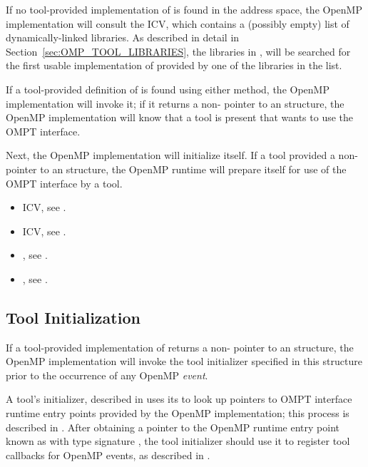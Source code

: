 If no tool-provided implementation of  is found in
the address space, the OpenMP implementation will consult the
 ICV, which contains a (possibly empty) list
of dynamically-linked libraries.  As described in detail in
Section~\ref{sec:OMP_TOOL_LIBRARIES}, the libraries in
, will be searched for the first usable
implementation of  provided by one of the libraries
in the list.

If a tool-provided definition of  is found using
either method, the OpenMP implementation will invoke it; if it returns
a non- pointer to an  structure, 
the OpenMP implementation will know
that a tool is present that wants to use the OMPT interface.

Next, the OpenMP implementation will initialize itself. If a tool
provided a non- pointer to an  structure,
the OpenMP runtime will prepare itself for use of the OMPT interface by a tool. 

\crossreferences
\begin{itemize}
\item {} ICV, see .
\item {} ICV, see .
\item {}, see .
\item {}, see .
\end{itemize}

\subsection{Tool Initialization}
\label{sec:tool-initialize}

If a tool-provided implementation of  returns a
non- pointer to an  structure,
the OpenMP implementation will invoke the tool initializer specified
in this structure prior to the occurrence of any OpenMP \emph{event}. 

A tool's initializer, described in 
uses its \callbackarg{}  to look up pointers
to OMPT interface runtime entry points provided by the OpenMP
implementation; this process is described in .
After obtaining a pointer to the OpenMP runtime entry point known as
 with type signature
, the tool initializer should use it to
register tool callbacks for OpenMP events, as described in
.

